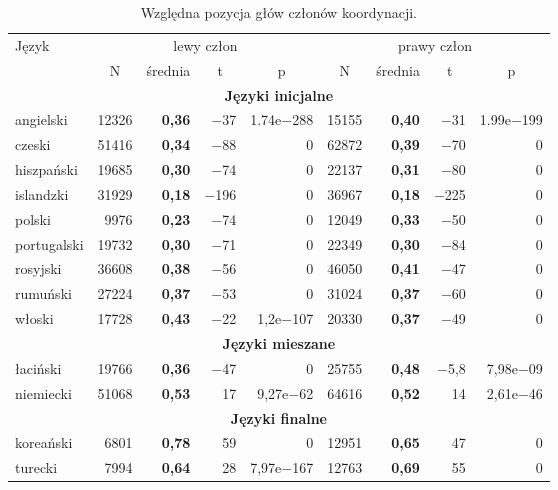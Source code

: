 \begin{table}[H]
\centering
\begin{tabular}{lrrrrrrrr}
  \toprule
Język & \multicolumn{4}{c}{lewy człon} & \multicolumn{4}{c}{prawy człon}\\
 & \multicolumn{1}{c}{N} & \multicolumn{1}{c}{średnia} & \multicolumn{1}{c}{t} & \multicolumn{1}{c}{p} & \multicolumn{1}{c}{N} & \multicolumn{1}{c}{średnia} & \multicolumn{1}{c}{t} & \multicolumn{1}{c}{p} \\ 
  \midrule
  \multicolumn{9}{c}{\textbf{Języki inicjalne}} \\
  \midrule
  angielski 	& 12326 	& \textbf{0,36} & $-$37 & 1.74e$-$288 & 15155 & \textbf{0,40} & $-$31 & 1.99e$-$199 \\
  czeski 	& 51416 	& \textbf{0,34} & $-$88 & 0 		& 62872 & \textbf{0,39} & $-$70 & 0 \\ 
  hiszpański	& 19685 & \textbf{0,30} & $-$74 & 0 		& 22137 & \textbf{0,31} & $-$80 & 0 \\ 
  islandzki 	& 31929 	& \textbf{0,18} & $-$196 & 0 		& 36967 & \textbf{0,18} & $-$225 & 0 \\ 
  polski 	& 9976 	& \textbf{0,23} & $-$74 & 0 		& 12049 & \textbf{0,33} & $-$50 & 0 \\ 
  portugalski & 19732 & \textbf{0,30} & $-$71 & 0 		& 22349 & \textbf{0,30} & $-$84 & 0 \\ 
  rosyjski 	& 36608 	& \textbf{0,38} & $-$56 & 0 		& 46050 & \textbf{0,41} & $-$47 & 0 \\ 
  rumuński 	& 27224 	& \textbf{0,37} & $-$53 & 0 		& 31024 & \textbf{0,37} & $-$60 & 0 \\ 
  włoski 	& 17728 	& \textbf{0,43} & $-$22 & 1,2e$-$107	& 20330 & \textbf{0,37} & $-$49 & 0 \\
  \midrule
  \multicolumn{9}{c}{\textbf{Języki mieszane}} \\
  \midrule
  łaciński 	& 19766 & \textbf{0,36}	& $-$47 & 0 		& 25755 & \textbf{0,48} & $-$5,8 & 7,98e$-$09 \\
  niemiecki & 51068 	& \textbf{0,53}	& 17 & 9,27e$-$62	& 64616 & \textbf{0,52} & 14 & 2,61e$-$46 \\ 
  \midrule
  \multicolumn{9}{c}{\textbf{Języki finalne}} \\
  \midrule
  koreański	& 6801 & \textbf{0,78} & 59 & 0 			& 12951 & \textbf{0,65} & 47 & 0 \\ 
  turecki 	& 7994 & \textbf{0,64} & 28 & 7,97e$-$167	& 12763 & \textbf{0,69} & 55 & 0 \\
  \bottomrule
\end{tabular}
\caption{Względna pozycja głów członów koordynacji.}
\label{tab:pozycja-głowy}
\end{table}

